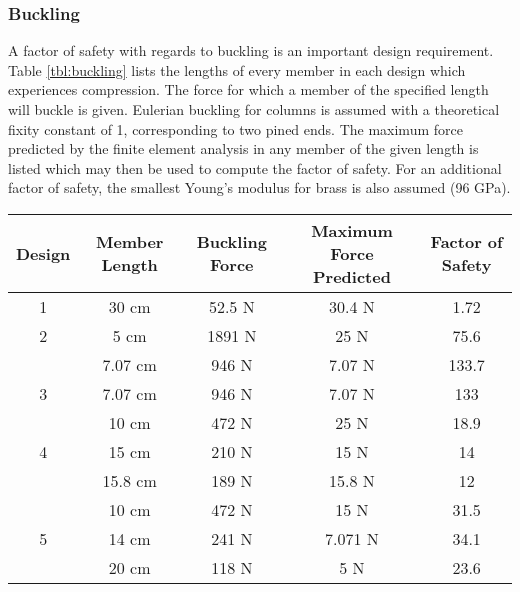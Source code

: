 \subsubsection{Buckling}

A factor of safety with regards to buckling is an important design requirement. 
Table \ref{tbl:buckling} lists the lengths of every member in each design which experiences compression.
The force for which a member of the specified length will buckle is given.
Eulerian buckling for columns is assumed with a theoretical fixity constant of 1,  corresponding to two pined ends.
The maximum force predicted by the finite element analysis in any member of the given length is listed which may then be used to compute the factor of safety. 
For an additional factor of safety, the smallest Young's modulus for brass is also assumed (96 GPa).


\begin{table*}[hp]
	\centering
	\caption{Force of Buckling - 5 N Load}
	\label{tbl:buckling}
	\vspace{6pt}
	\begin{tabular}{ccccc}
		\toprule
		Design & Member Length & Buckling Force & Maximum Force Predicted & Factor of Safety \\
		\midrule
		1 & 30 cm & 52.5 N & 30.4 N & 1.72 \\
		\midrule
		2 & 5 cm & 1891 N & 25 N & 75.6 \\
		 & 7.07 cm & 946 N & 7.07 N & 133.7 \\
		\midrule
		3 & 7.07 cm & 946 N & 7.07 N & 133 \\
		 & 10 cm & 472 N & 25 N & 18.9 \\
		\midrule
		4 & 15 cm & 210 N & 15 N & 14 \\
		 & 15.8 cm & 189 N & 15.8 N & 12 \\
		\midrule
		 & 10 cm & 472 N & 15 N & 31.5 \\
		5 & 14 cm & 241 N & 7.071 N  & 34.1 \\
		 & 20 cm & 118 N & 5 N & 23.6 \\
		\bottomrule
	\end{tabular}
\end{table*}
